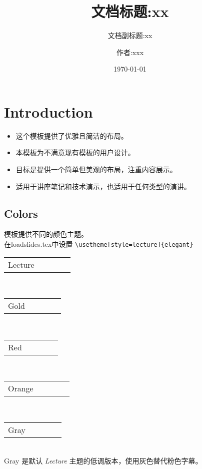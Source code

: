 \documentclass[
    11pt,
    notheorems,
    hyperref={pdfauthor=whatever}
]{beamer}
\title{文档标题:xx}
\subtitle{文档副标题:xx}
\author{作者:xxx}
\date{\today}
\begin{document}
\maketitleframe
\maketocframe

\section{Introduction}

\begin{frame}
    \begin{itemize}
        \item 这个模板提供了优雅且简洁的布局。
        \item 本模板为不满意现有模板的用户设计。
        \item 目标是提供一个简单但美观的布局，注重内容展示。
        \item 适用于讲座笔记和技术演示，也适用于任何类型的演讲。
    \end{itemize}
\end{frame}

\subsection{Colors}
\begin{frame}[fragile]
    \centering
    模板提供不同的颜色主题。\\
    在loadslides.tex中设置 \verb+\usetheme[style=lecture]{elegant}+\\[0.8cm]
    \newcommand{\colorRow}[1]{
        \begin{tabular}{p{4cm}cccc}
        #1 & \cellcolor{primary}\hspace*{1cm} &\cellcolor{secondary}\hspace*{1cm}&\cellcolor{tertiary}\hspace*{1cm}\\
        \end{tabular}
    }
    \colorRow{Lecture}\\[0.3cm]
    \colorRow{Gold}\\[0.3cm]
    \colorRow{Red}\\[0.3cm]
    \colorRow{Orange}\\[0.3cm]
    \colorRow{Gray}\\[0.3cm]

    \centering Gray 是默认 \textit{Lecture} 主题的低调版本，使用灰色替代粉色字幕。
\end{frame}
\end{document}
